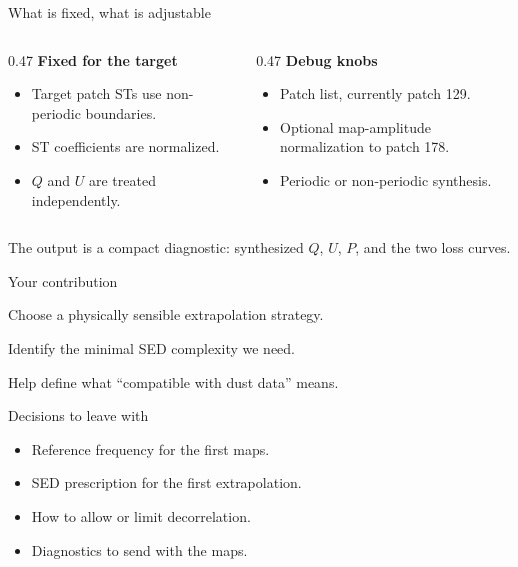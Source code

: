 \documentclass[aspectratio=169,11pt]{beamer}
\begin{document}
\begin{frame}{What is fixed, what is adjustable}
  \small
  \begin{columns}[T,onlytextwidth]
    \begin{column}{0.47\textwidth}
      \textbf{Fixed for the target}
      \begin{itemize}
        \item Target patch STs use non-periodic boundaries.
        \item ST coefficients are normalized.
        \item $Q$ and $U$ are treated independently.
      \end{itemize}
    \end{column}

    \begin{column}{0.47\textwidth}
      \textbf{Debug knobs}
      \begin{itemize}
        \item Patch list, currently patch 129.
        \item Optional map-amplitude normalization to patch 178.
        \item Periodic or non-periodic synthesis.
      \end{itemize}
    \end{column}
  \end{columns}

  \vspace{0.45cm}
  The output is a compact diagnostic: synthesized $Q$, $U$, $P$, and the
  two loss curves.
\end{frame}

\begin{frame}{Your contribution}
  \begin{center}
    \Large
    Choose a physically sensible extrapolation strategy.

    \vspace{0.8cm}
    Identify the minimal SED complexity we need.

    \vspace{0.8cm}
    Help define what ``compatible with dust data'' means.
  \end{center}
\end{frame}

\begin{frame}{Decisions to leave with}
  \begin{itemize}
    \item Reference frequency for the first maps.
    \item SED prescription for the first extrapolation.
    \item How to allow or limit decorrelation.
    \item Diagnostics to send with the maps.
  \end{itemize}
\end{frame}
\end{document}
